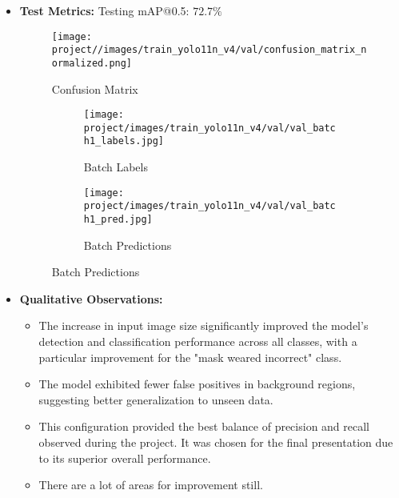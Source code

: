 \documentclass[11pt]{article}
\begin{document}
\begin{itemize}
    \item \textbf{Test Metrics:} Testing mAP@0.5: $72.7\%$

        \begin{figure}[H]
            \centering
            \caption{Confusion Matrix}
            \label{fig:enter-label}
            \texttt{[image: project//images/train\_yolo11n\_v4/val/confusion\_matrix\_normalized.png]} %
        \end{figure}

        \begin{figure}[H]
            \centering
            \caption{Comparison of Original and Labeled Images (Set 1)}
            \label{fig:set1}
            \begin{subfigure}[b]{0.48\textwidth} %
                \centering
                \caption{Batch Labels}
                \label{fig:input1}
                \texttt{[image: project/images/train\_yolo11n\_v4/val/val\_batch1\_labels.jpg]}
            \end{subfigure}
            \hspace{0.02\textwidth} %
            \begin{subfigure}[b]{0.48\textwidth} %
                \centering
                \caption{Batch Predictions}
                \label{fig:output1}
                \texttt{[image: project/images/train\_yolo11n\_v4/val/val\_batch1\_pred.jpg]}
            \end{subfigure}
        \end{figure}    

    \item \textbf{Qualitative Observations:}
        \begin{itemize}
            \item The increase in input image size significantly improved the model’s detection and classification performance across all classes, with a particular improvement for the "mask weared incorrect" class.
            \item The model exhibited fewer false positives in background regions, suggesting better generalization to unseen data.
            \item This configuration provided the best balance of precision and recall observed during the project. It was chosen for the final presentation due to its superior overall performance.
            \item There are a lot of areas for improvement still.
        \end{itemize}
\end{itemize}
\end{document}
